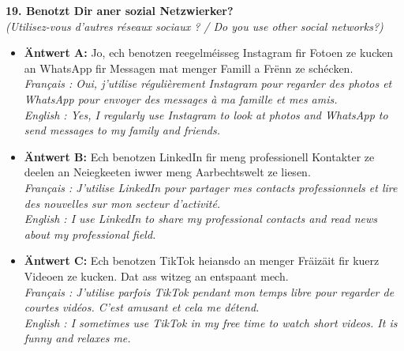 \noindent\textbf{19. Benotzt Dir aner sozial Netzwierker?}\\
\textit{(Utilisez-vous d'autres réseaux sociaux ? / Do you use other social networks?)}
\begin{itemize}
    \item \textbf{Äntwert A:} Jo, ech benotzen reegelméisseg Instagram fir Fotoen ze kucken an WhatsApp fir Messagen mat menger Famill a Frënn ze schécken.\\
    \textit{Français : Oui, j'utilise régulièrement Instagram pour regarder des photos et WhatsApp pour envoyer des messages à ma famille et mes amis.}\\
    \textit{English : Yes, I regularly use Instagram to look at photos and WhatsApp to send messages to my family and friends.}
    \item \textbf{Äntwert B:} Ech benotzen LinkedIn fir meng professionell Kontakter ze deelen an Neiegkeeten iwwer meng Aarbechtswelt ze liesen.\\
    \textit{Français : J'utilise LinkedIn pour partager mes contacts professionnels et lire des nouvelles sur mon secteur d'activité.}\\
    \textit{English : I use LinkedIn to share my professional contacts and read news about my professional field.}
    \item \textbf{Äntwert C:} Ech benotzen TikTok heiansdo an menger Fräizäit fir kuerz Videoen ze kucken. Dat ass witzeg an entspaant mech.\\
    \textit{Français : J'utilise parfois TikTok pendant mon temps libre pour regarder de courtes vidéos. C'est amusant et cela me détend.}\\
    \textit{English : I sometimes use TikTok in my free time to watch short videos. It is funny and relaxes me.}
\end{itemize}
\vspace{0.5em}

